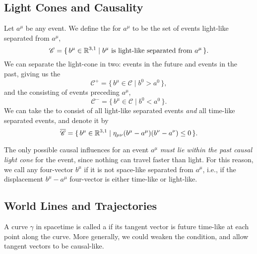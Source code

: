 \subsection{Light Cones and Causality}

\begin{definition}\label{defn:relativity:light-cone}
Let $a^{\mu}$ be any event. We define the  for $a^{\mu}$
to be the set of events light-like separated from $a^{\mu}$,
\begin{equation}
\mathscr{C} = \{\,b^{\mu}\in\mathbb{R}^{3,1} \mid b^{\mu}~\mbox{is light-like separated from}~a^{\mu}\,\}.
\end{equation}
We can separate the light-cone in two: events in the future and events
in the past, giving us the 
\begin{equation}
\mathscr{C}^{+} = \{\,b^{\mu}\in\mathscr{C} \mid b^{0} > a^{0}\,\},
\end{equation}
and the  consisting of events preceding $a^{\mu}$,
\begin{equation}
\mathscr{C}^{-} = \{\,b^{\mu}\in\mathscr{C} \mid b^{0} < a^{0}\,\}.
\end{equation}
We can take the  to consist of all light-like
separated events \emph{and} all time-like separated events, and denote
it by
\begin{equation}
\overline{\mathscr{C}} = \{\,b^{\mu}\in\mathbb{R}^{3,1} \mid \eta_{\mu\nu}(b^{\mu}-a^{\mu})(b^{\nu}-a^{\nu})\leq0\,\}.
\end{equation}
\end{definition}

\M
The only possible causal influences for an event $a^{\mu}$
\emph{must lie within the past causal light cone} for the event, since
nothing can travel faster than light. For this reason, we call any
four-vector $b^{\mu}$  if it is not space-like
separated from $a^{\mu}$, i.e., if the displacement $b^{\mu} - a^{\mu}$
four-vector is either time-like or light-like.

\subsection{World Lines and Trajectories}

A curve $\gamma$ in spacetime is called a 
if its tangent vector is future time-like at each point along the
curve. More generally, we could weaken the condition, and allow tangent
vectors to be causal-like.

